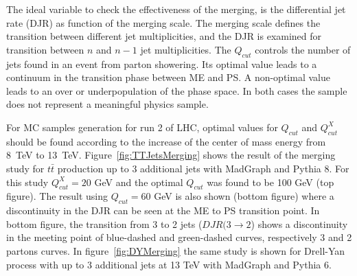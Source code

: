 The ideal variable to check the effectiveness of the merging, is the differential jet rate (DJR) as function of the merging scale. The merging scale defines the transition between different jet multiplicities, and the DJR is examined for transition between $n$ and $n-1$ jet multiplicities. The $Q_{cut}$ controls the number of jets found in an event from parton showering. Its optimal value leads to a continuum in the transition phase between ME and PS. A non-optimal value leads to an over or underpopulation of the phase space. In both cases the sample does not represent a meaningful physics sample.

For MC samples generation for run 2 of LHC, optimal values for $Q_{cut}$ and $Q^{X}_{cut}$ should be found according to the increase of the center of mass energy from 8~TeV to 13~TeV. Figure~\ref{fig:TTJetsMerging} shows the result of the merging study for $t\bar{t}$ production up to 3 additional jets with MadGraph and Pythia 8. For this study $Q^{X}_{cut}=20$ GeV and the optimal $Q_{cut}$ was found to be 100 GeV (top figure). The result using $Q_{cut}=60$ GeV is also shown (bottom figure) where a discontinuity in the DJR can be seen at the ME to PS transition point. In bottom figure, the transition from 3 to 2 jets ($DJR(3\to 2$) shows a discontinuity in the meeting point of blue-dashed and green-dashed curves, respectively 3 and 2 partons curves. In figure~\ref{fig:DYMerging} the same study is shown for Drell-Yan process with up to 3 additional jets at 13 TeV with MadGraph and Pythia 6. 

